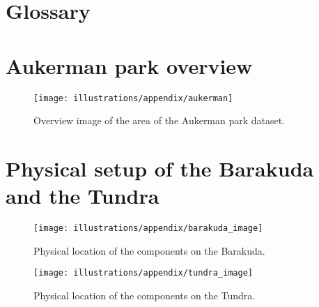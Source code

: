 \chapter{Glossary}\label{ch:glossary}

\begingroup
\renewcommand{\clearpage}{\relax}
\printglossary[type=\acronymtype]
\printglossary
\endgroup

\cleardoublepage
\printbibliography[heading=bibnumbered, title={Bibliography}]
\cleardoublepage
\appendix

\chapter{Aukerman park overview}\label{ch:aukerman-park-overview}

\begin{figure}[!ht]
    \centering
    \texttt{[image: illustrations/appendix/aukerman]}
    \caption{Overview image of the area of the Aukerman park dataset.}
    \label{fig:appendix:aukerman_overview}
\end{figure}


\chapter{Physical setup of the Barakuda and the Tundra}%
\vspace*{-2cm}%
\begin{figure}[!ht]%
    \centering%
    \texttt{[image: illustrations/appendix/barakuda\_image]}%
    \caption{Physical location of the components on the Barakuda.}%
    \label{fig:appendix:barakuda_image}%
\end{figure}%
\begin{figure}[!ht]%
    \centering%
    \texttt{[image: illustrations/appendix/tundra\_image]}%
    \caption{Physical location of the components on the Tundra.}%
    \label{fig:appendix:tundra_image}%
\end{figure}%
